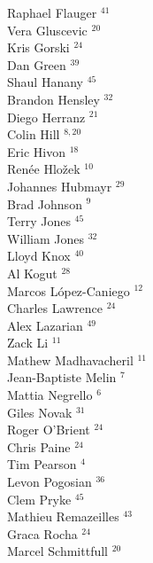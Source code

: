 \documentclass[PICOReport.tex]{subfiles}
\begin{document}
{\begin{multicols}{4}
Raphael Flauger $^{41}$                 \\
Vera Gluscevic $^{20}$                  \\
Kris Gorski $^{24}$                     \\
Dan Green $^{39}$                       \\
Shaul Hanany $^{45}$                    \\
Brandon Hensley $^{32}$                 \\
Diego Herranz $^{21}$                   \\
Colin Hill $^{8,20}$                      \\
Eric Hivon $^{18}$                      \\
Ren\'{e}e  Hlo\v{z}ek $^{10}$           \\
Johannes Hubmayr $^{29}$                \\
Brad Johnson $^{9}$                    \\
Terry Jones $^{45}$                     \\
William Jones $^{32}$                   \\
Lloyd Knox $^{40}$                      \\
Al Kogut $^{28}$                        \\
Marcos L\'{o}pez-Caniego $^{12}$        \\
Charles Lawrence $^{24}$                \\
Alex Lazarian $^{49}$                   \\
Zack Li $^{11}$                         \\
Mathew Madhavacheril $^{11}$            \\
Jean-Baptiste Melin $^{7}$             \\
Mattia Negrello $^{6}$                 \\
Giles Novak $^{31}$                     \\
Roger O'Brient $^{24}$                  \\
Chris Paine $^{24}$                     \\
Tim Pearson $^{4}$                     \\
Levon Pogosian $^{36}$                  \\
Clem Pryke $^{45}$                      \\
Mathieu Remazeilles $^{43}$             \\
Graca Rocha $^{24}$                     \\
Marcel Schmittfull $^{20}$              \\

\end{multicols}}
\end{document}
